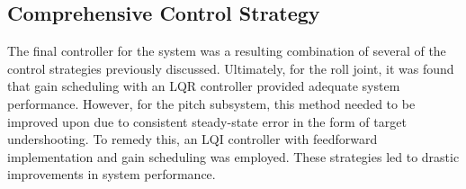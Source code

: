 \subsection{Comprehensive Control Strategy}


The final controller for the system was a resulting combination of several of the control strategies previously discussed. Ultimately, for the roll joint, it was found that gain scheduling with an LQR controller provided adequate system performance. However, for the pitch subsystem, this method needed to be improved upon due to consistent steady-state error in the form of target undershooting. To remedy this, an LQI controller with feedforward implementation and gain scheduling was employed. These strategies led to drastic improvements in system performance.

